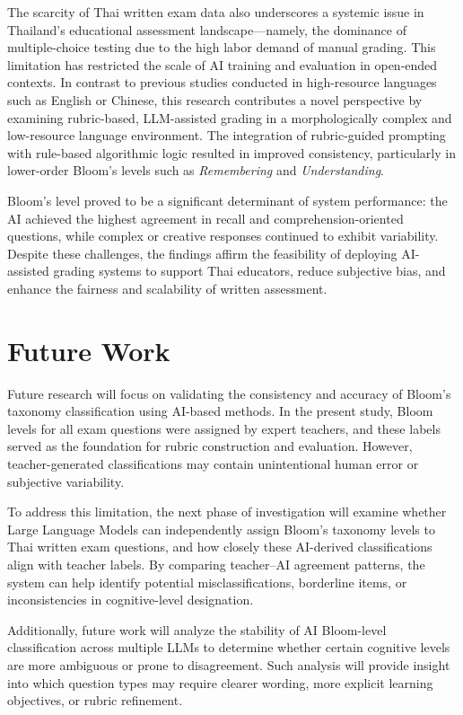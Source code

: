 The scarcity of Thai written exam data also underscores a 
systemic issue in Thailand’s educational assessment 
landscape—namely, the dominance of multiple-choice testing due 
to the high labor demand of manual grading. This limitation 
has restricted the scale of AI training and evaluation in 
open-ended contexts. In contrast to previous studies conducted 
in high-resource languages such as English or Chinese, this 
research contributes a novel perspective by examining 
rubric-based, LLM-assisted grading in a morphologically 
complex and low-resource language environment. The integration 
of rubric-guided prompting with rule-based algorithmic logic 
resulted in improved consistency, particularly in lower-order 
Bloom’s levels such as \textit{Remembering} and 
\textit{Understanding}.

Bloom’s level proved to be a significant determinant of system 
performance: the AI achieved the highest agreement in recall 
and comprehension-oriented questions, while complex or 
creative responses continued to exhibit variability. Despite 
these challenges, the findings affirm the feasibility of 
deploying AI-assisted grading systems to support Thai 
educators, reduce subjective bias, and enhance the fairness 
and scalability of written assessment.


\section{Future Work}

Future research will focus on validating the consistency and
accuracy of Bloom’s taxonomy classification using AI-based
methods. In the present study, Bloom levels for all exam
questions were assigned by expert teachers, and these labels
served as the foundation for rubric construction and
evaluation. However, teacher-generated classifications may
contain unintentional human error or subjective variability.

To address this limitation, the next phase of investigation
will examine whether Large Language Models can independently
assign Bloom’s taxonomy levels to Thai written exam questions,
and how closely these AI-derived classifications align with
teacher labels. By comparing teacher–AI agreement patterns,
the system can help identify potential misclassifications,
borderline items, or inconsistencies in cognitive-level
designation.

Additionally, future work will analyze the stability of AI
Bloom-level classification across multiple LLMs to determine
whether certain cognitive levels are more ambiguous or prone to
disagreement. Such analysis will provide insight into which
question types may require clearer wording, more explicit
learning objectives, or rubric refinement.


